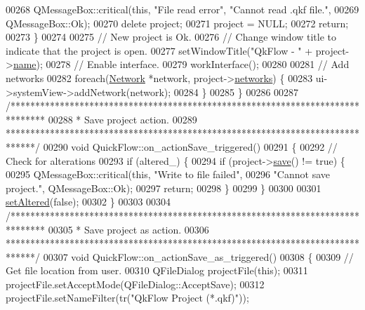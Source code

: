 \begin{DoxyCode}
00268     QMessageBox::critical(\textcolor{keyword}{this}, \textcolor{stringliteral}{"File read error"}, \textcolor{stringliteral}{"Cannot read .qkf file."},
00269                           QMessageBox::Ok);
00270     \textcolor{keyword}{delete} project;
00271     project = NULL;
00272     \textcolor{keywordflow}{return};
00273   \}
00274 
00275   \textcolor{comment}{// New project is Ok.}
00276   \textcolor{comment}{// Change window title to indicate that the project is open.}
00277   setWindowTitle(\textcolor{stringliteral}{"QkFlow - "} + project->\hyperlink{class_project_a82dd2d1bc38f9fd08c9a811fcaa76b38}{name});
00278   \textcolor{comment}{// Enable interface.}
00279   workInterface();
00280 
00281   \textcolor{comment}{// Add networks}
00282   \textcolor{keywordflow}{foreach}(\hyperlink{class_network}{Network} *network, project->\hyperlink{class_project_aa98126154cab59769a431668e6f17daf}{networks}) \{
00283     ui->systemView->addNetwork(network);
00284   \}
00285 \}
00286 
00287 \textcolor{comment}{/*******************************************************************************}
00288 \textcolor{comment}{ * Save project action.}
00289 \textcolor{comment}{ ******************************************************************************/}
00290 \textcolor{keywordtype}{void} QuickFlow::on\_actionSave\_triggered()
00291 \{
00292   \textcolor{comment}{// Check for alterations}
00293   \textcolor{keywordflow}{if} (altered\_) \{
00294     \textcolor{keywordflow}{if} (project->\hyperlink{class_project_a596a875bc5be73bc5b1b71b6448c1e07}{save}() != \textcolor{keyword}{true}) \{
00295       QMessageBox::critical(\textcolor{keyword}{this}, \textcolor{stringliteral}{"Write to file failed"},
00296                             \textcolor{stringliteral}{"Cannot save project."}, QMessageBox::Ok);
00297       \textcolor{keywordflow}{return};
00298     \}
00299   \}
00300 
00301   \hyperlink{group___window_ga4b63ea5ca52a9eea14db0a22b5a133f8}{setAltered}(\textcolor{keyword}{false});
00302 \}
00303 
00304 \textcolor{comment}{/*******************************************************************************}
00305 \textcolor{comment}{ * Save project as action.}
00306 \textcolor{comment}{ ******************************************************************************/}
00307 \textcolor{keywordtype}{void} QuickFlow::on\_actionSave\_as\_triggered()
00308 \{
00309   \textcolor{comment}{// Get file location from user.}
00310   QFileDialog projectFile(\textcolor{keyword}{this});
00311   projectFile.setAcceptMode(QFileDialog::AcceptSave);
00312   projectFile.setNameFilter(tr(\textcolor{stringliteral}{"QkFlow Project (*.qkf)"}));

\end{DoxyCode}
